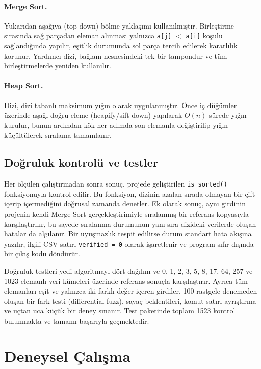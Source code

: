 \documentclass[12pt,a4paper]{article}
\begin{document}
\paragraph{Merge Sort.} Yukarıdan aşağıya (top-down) bölme yaklaşımı
kullanılmıştır. Birleştirme sırasında sağ parçadan eleman alınması yalnızca
\texttt{a[j]} $<$ \texttt{a[i]} koşulu sağlandığında yapılır, eşitlik durumunda sol parça
tercih edilerek kararlılık korunur. Yardımcı dizi, bağlam nesnesindeki tek bir
tampondur ve tüm birleştirmelerde yeniden kullanılır.

\paragraph{Heap Sort.} Dizi, dizi tabanlı maksimum yığın olarak
uygulanmıştır. Önce iç düğümler üzerinde aşağı doğru eleme (heapify/sift-down) yapılarak
$O(n)$ sürede yığın kurulur, bunun ardından kök her adımda son elemanla değiştirilip
yığın küçültülerek sıralama tamamlanır.

\subsection{Doğruluk kontrolü ve testler}

Her ölçülen çalıştırmadan sonra sonuç, projede geliştirilen
\texttt{is\_sorted()} fonksiyonuyla kontrol edilir. Bu fonksiyon, dizinin
azalan sırada olmayan bir çift içerip içermediğini doğrusal zamanda denetler.
Ek olarak sonuç, aynı girdinin projenin kendi Merge Sort gerçekleştirimiyle
sıralanmış bir referans kopyasıyla karşılaştırılır, bu sayede sıralanma durumunun yanı sıra
dizideki verilerde oluşan hatalar da algılanır. Bir uyuşmazlık
tespit edilirse durum standart hata akışına yazılır, ilgili CSV satırı
\texttt{verified = 0} olarak işaretlenir ve program sıfır dışında bir çıkış kodu
döndürür.

Doğruluk testleri yedi algoritmayı dört dağılım ve 0, 1, 2, 3, 5, 8, 17, 64, 257
ve 1023 elemanlı veri kümeleri üzerinde referans sonuçla karşılaştırır. Ayrıca
tüm elemanları eşit ve yalnızca iki farklı değer içeren girdiler, 100 rastgele
denemeden oluşan bir fark testi (differential fuzz), sayaç beklentileri, komut
satırı ayrıştırma ve uçtan uca küçük bir deney sınanır. Test paketinde toplam
1523 kontrol bulunmakta ve tamamı başarıyla geçmektedir.

\section{Deneysel Çalışma}
\end{document}
